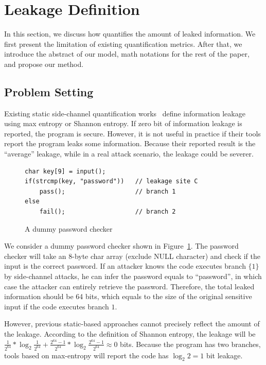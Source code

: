 \section{\tool{} Leakage Definition}
\label{sec:trace-qif}
In this section, we discuss how \tool{} quantifies the amount of leaked
information. We first present the limitation of existing quantification metrics.
After that, we introduce the abstract of our model, math notations for the
rest of the paper, and propose our method.

\subsection{Problem Setting}
Existing static side-channel quantification
works~\cite{182946,Wichelmann:2018:MFF:3274694.3274741 } define information
leakage using max entropy or Shannon entropy.  If zero bit of
information leakage is reported, the program is secure. However, it is not
useful in practice if their tools report the program leaks some information.
Because their reported result is the ``average'' leakage, while in a real attack
scenario, the leakage could be severer.


\begin{figure}[h!]
    \centering
    \begin{lstlisting}[xleftmargin=.03\textwidth,xrightmargin=.01\textwidth]
char key[9] = input();
if(strcmp(key, "password"))   // leakage site C
    pass();                   // branch 1
else
    fail();                   // branch 2
\end{lstlisting}
\vspace*{1pt}
    \caption{A dummy password checker}
    \label{fig:password-checker}
\end{figure}

We consider a dummy password checker shown in Figure~\ref{fig:password-checker}.
The password checker will take an 8-byte char array (exclude \textsf{NULL} character) 
and check if the input is the correct password. If an attacker knows the code executes branch
$\{{1\}}$ by side-channel attacks, he can infer the password equals to
``password'', in which case the attacker can entirely retrieve the password.
Therefore, the total leaked information should be 64 bits, which equals to the
size of the original sensitive input if the code executes branch
$1$.

However, previous static-based approaches cannot precisely reflect the amount of
the leakage. According to the definition of Shannon entropy, the leakage will be
$\frac{1}{2^{64}}*\log_{2}\frac{1}{2^{64}} + \frac{2^{64}-1}{2^{64}}
*\log_{2}\frac{2^{64}-1}{2^{64}} \approx 0$ bits. Because the program has two
branches, tools based on max-entropy will report the code has $\log_2{2} = 1$
bit leakage.

